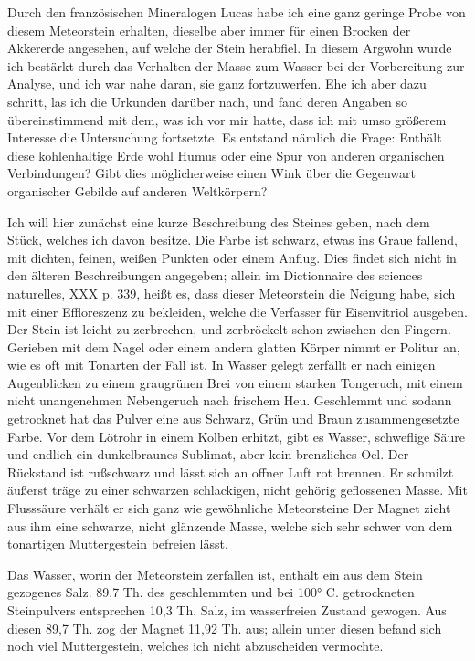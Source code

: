 \documentclass[a4paper, 11pt, oneside]{article}
\begin{document}
Durch den französischen Mineralogen Lucas habe ich eine ganz geringe Probe von diesem Meteorstein erhalten, dieselbe aber immer für einen Brocken der Akkererde angesehen, auf welche der Stein herabfiel. In diesem Argwohn wurde ich bestärkt durch das Verhalten der Masse zum Wasser bei der Vorbereitung zur Analyse, und ich war nahe daran, sie ganz fortzuwerfen. Ehe ich aber dazu schritt, las ich die Urkunden darüber nach, und fand deren Angaben so übereinstimmend mit dem, was ich vor mir hatte, dass ich mit umso größerem Interesse die Untersuchung fortsetzte. Es entstand nämlich die Frage: Enthält diese kohlenhaltige Erde wohl Humus oder eine Spur von anderen organischen Verbindungen? Gibt dies möglicherweise einen Wink über die Gegenwart organischer Gebilde auf anderen Weltkörpern?

Ich will hier zunächst eine kurze Beschreibung des Steines geben, nach dem Stück, welches ich davon besitze. Die Farbe ist schwarz, etwas ins Graue fallend, mit dichten, feinen, weißen Punkten oder einem Anflug. Dies findet sich nicht in den älteren Beschreibungen angegeben; allein im Dictionnaire des sciences naturelles, XXX p. 339, heißt es, dass dieser Meteorstein die Neigung habe, sich mit einer Effloreszenz zu bekleiden, welche die Verfasser für Eisenvitriol ausgeben. Der Stein ist leicht zu zerbrechen, und zerbröckelt schon zwischen den Fingern. Gerieben mit dem Nagel oder einem andern glatten Körper nimmt er Politur an, wie es oft mit Tonarten der Fall ist. In Wasser gelegt zerfällt er nach einigen Augenblicken zu einem graugrünen Brei von einem starken Tongeruch, mit einem nicht unangenehmen Nebengeruch nach frischem Heu. Geschlemmt und sodann getrocknet hat das Pulver eine aus Schwarz, Grün und Braun zusammengesetzte Farbe. Vor dem Lötrohr in einem Kolben erhitzt, gibt es Wasser, schweflige Säure und endlich ein dunkelbraunes Sublimat, aber kein brenzliches Oel. Der Rückstand ist rußschwarz und lässt sich an offner Luft rot brennen. Er schmilzt äußerst träge zu einer schwarzen schlackigen, nicht gehörig geflossenen Masse. Mit Flusssäure verhält er sich ganz wie gewöhnliche Meteorsteine Der Magnet zieht aus ihm eine schwarze, nicht glänzende Masse, welche sich sehr schwer von dem tonartigen Muttergestein befreien lässt.

Das Wasser, worin der Meteorstein zerfallen ist, enthält ein aus dem Stein gezogenes Salz. 89,7 Th. des geschlemmten und bei 100° C. getrockneten Steinpulvers entsprechen 10,3 Th. Salz, im wasserfreien Zustand gewogen. Aus diesen 89,7 Th. zog der Magnet 11,92 Th. aus; allein unter diesen befand sich noch viel Muttergestein, welches ich nicht abzuscheiden vermochte.
\end{document}
